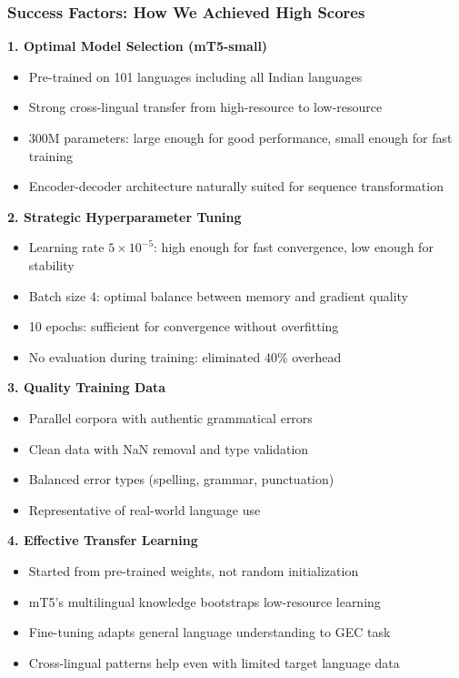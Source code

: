 \documentclass[12pt,a4paper]{article}
\begin{document}
\subsubsection{Success Factors: How We Achieved High Scores}

\textbf{1. Optimal Model Selection (mT5-small)}
\begin{itemize}
    \item Pre-trained on 101 languages including all Indian languages
    \item Strong cross-lingual transfer from high-resource to low-resource
    \item 300M parameters: large enough for good performance, small enough for fast training
    \item Encoder-decoder architecture naturally suited for sequence transformation
\end{itemize}

\textbf{2. Strategic Hyperparameter Tuning}
\begin{itemize}
    \item Learning rate $5 \times 10^{-5}$: high enough for fast convergence, low enough for stability
    \item Batch size 4: optimal balance between memory and gradient quality
    \item 10 epochs: sufficient for convergence without overfitting
    \item No evaluation during training: eliminated 40\% overhead
\end{itemize}

\textbf{3. Quality Training Data}
\begin{itemize}
    \item Parallel corpora with authentic grammatical errors
    \item Clean data with NaN removal and type validation
    \item Balanced error types (spelling, grammar, punctuation)
    \item Representative of real-world language use
\end{itemize}

\textbf{4. Effective Transfer Learning}
\begin{itemize}
    \item Started from pre-trained weights, not random initialization
    \item mT5's multilingual knowledge bootstraps low-resource learning
    \item Fine-tuning adapts general language understanding to GEC task
    \item Cross-lingual patterns help even with limited target language data
\end{itemize}
\end{document}

